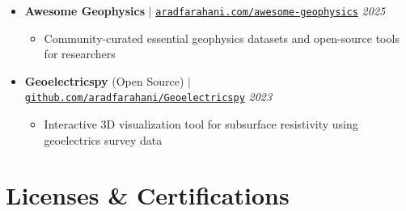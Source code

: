 \documentclass[letterpaper,11pt]{article}
\begin{document}
	\begin{itemize}[left=0pt, label={}, topsep=7.5pt, partopsep=0pt, itemsep=6pt, parsep=0pt]
	\item \textbf{Awesome Geophysics} $|$ \normalfont\href{https://aradfarahani.com/awesome-geophysics/}{\texttt{aradfarahani.com/awesome-geophysics}} \hfill \textit{2025}
	\begin{itemize}[left=15pt, label=\textbullet, topsep=4pt, partopsep=0pt, itemsep=3pt, parsep=0pt]
		\item Community-curated essential geophysics datasets and open-source tools for researchers
	\end{itemize}
\end{itemize}

	\begin{itemize}[left=0pt, label={}, topsep=7.5pt, partopsep=0pt, itemsep=6pt, parsep=0pt]
		\item \textbf{Geoelectricspy} (Open Source) $|$ \normalfont\href{https://github.com/aradfarahani/Geoelectricspy/}{\texttt{github.com/aradfarahani/Geoelectricspy}} \hfill \textit{2023}
		\begin{itemize}[left=15pt, label=\textbullet, topsep=4pt, partopsep=0pt, itemsep=3pt, parsep=0pt]
			\item Interactive 3D visualization tool for subsurface resistivity using geoelectrics survey data
		\end{itemize}
	\end{itemize}
	
	
	\section{Licenses \& Certifications}
\end{document}
